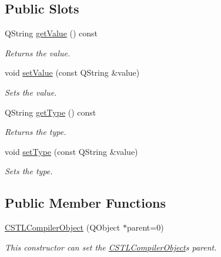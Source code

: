 \subsection*{Public Slots}
\begin{DoxyCompactItemize}
\item 
Q\+String \hyperlink{class_c_s_t_l_compiler_object_a3ee0eea5271717302cd4cb34720b656e}{get\+Value} () const
\begin{DoxyCompactList}\small\item\em Returns the value. \end{DoxyCompactList}\item 
void \hyperlink{class_c_s_t_l_compiler_object_ab32dd59c381d9fbf7d2ce58226c4f93a}{set\+Value} (const Q\+String \&value)
\begin{DoxyCompactList}\small\item\em Sets the value. \end{DoxyCompactList}\item 
Q\+String \hyperlink{class_c_s_t_l_compiler_object_a3e853137310474444650ad78e307b9a8}{get\+Type} () const
\begin{DoxyCompactList}\small\item\em Returns the type. \end{DoxyCompactList}\item 
void \hyperlink{class_c_s_t_l_compiler_object_a16ec55cd3515f6d72c79c565bcad9243}{set\+Type} (const Q\+String \&value)
\begin{DoxyCompactList}\small\item\em Sets the type. \end{DoxyCompactList}\end{DoxyCompactItemize}
\subsection*{Public Member Functions}
\begin{DoxyCompactItemize}
\item 
\hyperlink{class_c_s_t_l_compiler_object_a31f110c6081112d484a85348520b0678}{C\+S\+T\+L\+Compiler\+Object} (Q\+Object $\ast$parent=0)
\begin{DoxyCompactList}\small\item\em This constructor can set the \hyperlink{class_c_s_t_l_compiler_object}{C\+S\+T\+L\+Compiler\+Object}\textquotesingle{}s parent. \end{DoxyCompactList}\end{DoxyCompactItemize}


